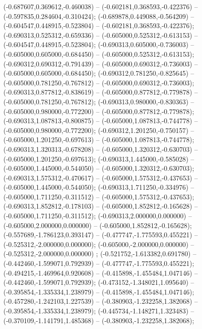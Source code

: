 (-0.687607,0.369612,-0.460038) -- (-0.602181,0.368593,-0.422376) -- (-0.597835,0.284604,-0.310424);
 (-0.689878,0.449088,-0.564209) -- (-0.604547,0.448915,-0.523804) -- (-0.602181,0.368593,-0.422376);
 (-0.690313,0.525312,-0.659336) -- (-0.605000,0.525312,-0.613153) -- (-0.604547,0.448915,-0.523804);
 (-0.690313,0.605000,-0.736003) -- (-0.605000,0.605000,-0.684450) -- (-0.605000,0.525312,-0.613153);
 (-0.690312,0.690312,-0.791439) -- (-0.605000,0.690312,-0.736003) -- (-0.605000,0.605000,-0.684450);
 (-0.690312,0.781250,-0.825645) -- (-0.605000,0.781250,-0.767812) -- (-0.605000,0.690312,-0.736003);
 (-0.690313,0.877812,-0.838619) -- (-0.605000,0.877812,-0.779878) -- (-0.605000,0.781250,-0.767812);
 (-0.690313,0.980000,-0.830363) -- (-0.605000,0.980000,-0.772200) -- (-0.605000,0.877812,-0.779878);
 (-0.690313,1.087813,-0.800875) -- (-0.605000,1.087813,-0.744778) -- (-0.605000,0.980000,-0.772200);
 (-0.690312,1.201250,-0.750157) -- (-0.605000,1.201250,-0.697613) -- (-0.605000,1.087813,-0.744778);
 (-0.690313,1.320313,-0.678208) -- (-0.605000,1.320312,-0.630703) -- (-0.605000,1.201250,-0.697613);
 (-0.690313,1.445000,-0.585028) -- (-0.605000,1.445000,-0.544050) -- (-0.605000,1.320312,-0.630703);
 (-0.690313,1.575312,-0.470617) -- (-0.605000,1.575312,-0.437653) -- (-0.605000,1.445000,-0.544050);
 (-0.690313,1.711250,-0.334976) -- (-0.605000,1.711250,-0.311512) -- (-0.605000,1.575312,-0.437653);
 (-0.690313,1.852812,-0.178103) -- (-0.605000,1.852812,-0.165628) -- (-0.605000,1.711250,-0.311512);
 (-0.690313,2.000000,0.000000) -- (-0.605000,2.000000,0.000000) -- (-0.605000,1.852812,-0.165628);
 (-0.557689,-1.786123,0.393147) -- (-0.477747,-1.775593,0.455221) -- (-0.525312,-2.000000,0.000000);
 (-0.605000,-2.000000,0.000000) -- (-0.525312,-2.000000,0.000000) ;
 (-0.521752,-1.613382,0.691780) -- (-0.442460,-1.599071,0.792939) -- (-0.477747,-1.775593,0.455221);
 (-0.494215,-1.469964,0.920608) -- (-0.415898,-1.455484,1.047146) -- (-0.442460,-1.599071,0.792939);
 (-0.473152,-1.348021,1.095640) -- (-0.395854,-1.335334,1.238979) -- (-0.415898,-1.455484,1.047146);
 (-0.457280,-1.242103,1.227539) -- (-0.380903,-1.232258,1.382068) -- (-0.395854,-1.335334,1.238979);
 (-0.445734,-1.148271,1.323483) -- (-0.370109,-1.141791,1.485368) -- (-0.380903,-1.232258,1.382068);

